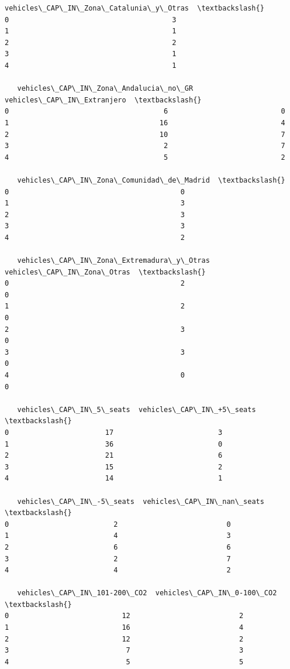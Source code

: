 \documentclass[11pt]{article}
\begin{document}
\begin{tcolorbox}[breakable, size=fbox, boxrule=.5pt, pad at break*=1mm, opacityfill=0]
\begin{Verbatim}[commandchars=\\\{\}]
   vehicles\_CAP\_IN\_Zona\_Catalunia\_y\_Otras  \textbackslash{}
0                                       3
1                                       1
2                                       2
3                                       1
4                                       1

   vehicles\_CAP\_IN\_Zona\_Andalucia\_no\_GR  vehicles\_CAP\_IN\_Extranjero  \textbackslash{}
0                                     6                           0
1                                    16                           4
2                                    10                           7
3                                     2                           7
4                                     5                           2

   vehicles\_CAP\_IN\_Zona\_Comunidad\_de\_Madrid  \textbackslash{}
0                                         0
1                                         3
2                                         3
3                                         3
4                                         2

   vehicles\_CAP\_IN\_Zona\_Extremadura\_y\_Otras  vehicles\_CAP\_IN\_Zona\_Otras  \textbackslash{}
0                                         2                           0
1                                         2                           0
2                                         3                           0
3                                         3                           0
4                                         0                           0

   vehicles\_CAP\_IN\_5\_seats  vehicles\_CAP\_IN\_+5\_seats  \textbackslash{}
0                       17                         3
1                       36                         0
2                       21                         6
3                       15                         2
4                       14                         1

   vehicles\_CAP\_IN\_-5\_seats  vehicles\_CAP\_IN\_nan\_seats  \textbackslash{}
0                         2                          0
1                         4                          3
2                         6                          6
3                         2                          7
4                         4                          2

   vehicles\_CAP\_IN\_101-200\_CO2  vehicles\_CAP\_IN\_0-100\_CO2  \textbackslash{}
0                           12                          2
1                           16                          4
2                           12                          2
3                            7                          3
4                            5                          5


\end{Verbatim}
\end{tcolorbox}
\end{document}
